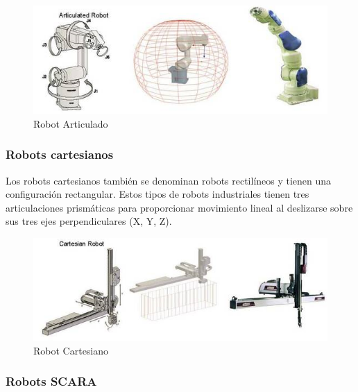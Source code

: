         \begin{figure}[htb]
            \centering
            \includegraphics[width=1.0\linewidth]{Main/Chapter2/Images2/Robot-articulado.png}
            \caption{Robot Articulado \cite{cap2_class_mov}}
            \label{f:Cap2_segunMovimiento_articulado}
        \end{figure}
        
        \subsubsection{Robots cartesianos}
        
        Los robots cartesianos también se denominan robots rectilíneos y tienen una configuración rectangular. Estos tipos de robots industriales tienen tres articulaciones prismáticas para proporcionar movimiento lineal al deslizarse sobre sus tres ejes perpendiculares (X, Y, Z). 
        
        \begin{figure}[htb]
            \centering
            \includegraphics[width=1.0\linewidth]{Main/Chapter2/Images2/Robot-cartesiano.png}
            \caption{Robot Cartesiano \cite{cap2_class_mov}}
            \label{f:Cap2_segunMovimiento_cartesiano}
        \end{figure}
        
        \newpage

        
        \subsubsection{Robots SCARA}
        
